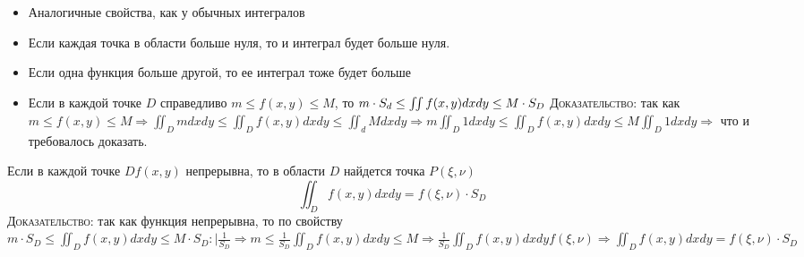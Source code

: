\begin{itemize}
    \begin{itemize}
        \item Аналогичные свойства, как у обычных интегралов
        \item Если каждая точка в области больше нуля, то и интеграл будет больше нуля.
        \item Если одна функция больше другой, то ее интеграл тоже будет больше 
        \item Если в каждой точке $D$ справедливо $m \leq f(x,y) \leq M$, то $ m \cdot S_d \leq \iint f(x,y)dxdy \leq M \cdot S_D \\ $ \textsc{Доказательство:} так как $m \leq f(x,y) \leq M \Rightarrow \iint_D mdxdy \leq \iint_D f(x,y) dxdy \leq \iint_d Mdxdy \Rightarrow m \iint_D 1dxdy \leq \iint_D f(x,y)dxdy \leq M \iint_D 1dxdy \Rightarrow $ что и требовалось доказать.
    \end{itemize}

    \begin{theorem}[О среднем]
            Если в каждой точке $D f(x,y)$ непрерывна, то в области $D$ найдется точка $P(\xi,\nu)$
            $$\iint_D f(x,y)dxdy = f(\xi, \nu) \cdot S_D$$
            \textsc{Доказательство:} так как функция непрерывна, то по свойству $m\cdot S_D \leq \iint_D f(x,y)dxdy \leq M\cdot S_D :| \frac{1}{S_D} \Rightarrow m \leq \frac{1}{S_D} \iint_D f(x,y)dxdy \leq M \Rightarrow \frac{1}{S_D} \iint_D f(x,y) dxdy f(\xi, \nu) \Rightarrow \iint_D f(x,y)dxdy = f(\xi,\nu) \cdot S_D$
    \end{theorem}
\end{itemize}